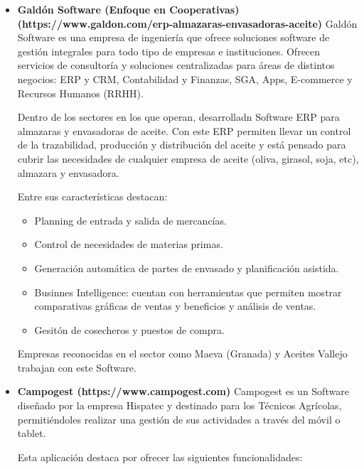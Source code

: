 \begin{itemize}
    \item \textbf{Galdón Software (Enfoque en Cooperativas) (https://www.galdon.com/erp-almazaras-envasadoras-aceite)}
    \newline
    Galdón Software es una empresa de ingeniería que ofrece soluciones software de gestión integrales para todo tipo de
    empresas e instituciones. Ofrecen servicios de consultoría y soluciones centralizadas para áreas de distintos
    negocios: ERP y CRM, Contabilidad y Finanzas, SGA, Apps, E-commerce y Recursos Humanos (RRHH).

    Dentro de los sectores en los que operan, desarrolladn Software ERP para almazaras y envasadoras de aceite. Con este
    ERP permiten llevar un control de la trazabilidad, producción y distribución del aceite y está pensado para cubrir
    las necesidades de cualquier empresa de aceite (oliva, girasol, soja, etc), almazara y envasadora.

    Entre sus características destacan:

    \begin{itemize}
        \item Planning de entrada y salida de mercancías.
        \item Control de necesidades de materias primas.
        \item Generación automática de partes de envasado y planificación asistida.
        \item Businnes Intelligence: cuentan con herramientas que permiten mostrar comparativas gráficas de ventas y 
        beneficios y análisis de ventas.
        \item Gesitón de cosecheros y puestos de compra.
    \end{itemize}

    Empresas reconocidas en el sector como Maeva (Granada) y Aceites Vallejo trabajan con este Software.

    \item \textbf{Campogest (https://www.campogest.com)}
    \newline
    Campogest es un Software diseñado por la empresa Hispatec y destinado para los Técnicos Agrícolas, permitiéndoles 
    realizar una gestión de sus actividades a través del móvil o tablet.

    Esta aplicación destaca por ofrecer las siguientes funcionalidades:


\end{itemize}
